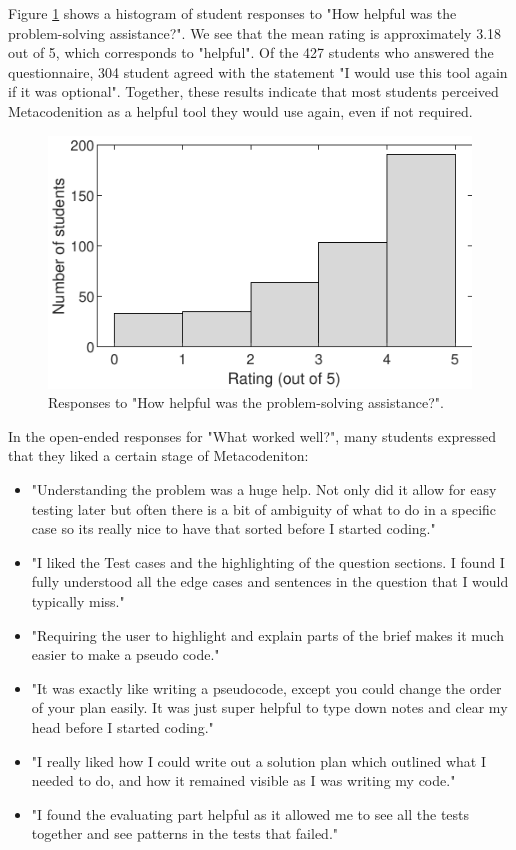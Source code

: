 \documentclass[sigconf,authorversion,nonacm]{acmart}
\begin{document}
Figure \ref{fig:usefulness} shows a histogram of student responses to "How helpful was the problem-solving assistance?". We see that the mean rating is approximately 3.18 out of 5, which corresponds to "helpful". Of the 427 students who answered the questionnaire, 304 student agreed with the statement "I would use this tool again if it was optional". Together, these results indicate that most students perceived Metacodenition as a helpful tool they would use again, even if not required.

\begin{figure}[h!]
  \centering
  \includegraphics[width=\columnwidth]{usefulness_responses}
  \caption{Responses to "How helpful was the problem-solving assistance?".}
  \label{fig:usefulness}
\end{figure}

In the open-ended responses for "What worked well?", many students expressed that they liked a certain stage of Metacodeniton:
\begin{itemize}
    \item "Understanding the problem was a huge help. Not only did it allow for easy testing later but often there is a bit of ambiguity of what to do in a specific case so its really nice to have that sorted before I started coding."
    \item "I liked the Test cases and the highlighting of the question sections. I found I fully understood all the edge cases and sentences in the question that I would typically miss."
     \item "Requiring the user to highlight and explain parts of the brief makes it much easier to make a pseudo code."
     \item "It was exactly like writing a pseudocode, except you could change the order of your plan easily. It was just super helpful to type down notes and clear my head before I started coding."
    \item "I really liked how I could write out a solution plan which outlined what I needed to do, and how it remained visible as I was writing my code."
    \item "I found the evaluating part helpful as it allowed me to see all the tests together and see patterns in the tests that failed."
\end{itemize}
\end{document}
